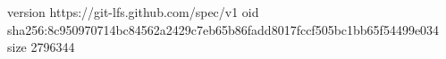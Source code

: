 version https://git-lfs.github.com/spec/v1
oid sha256:8c950970714bc84562a2429c7eb65b86fadd8017fccf505bc1bb65f54499e034
size 2796344
